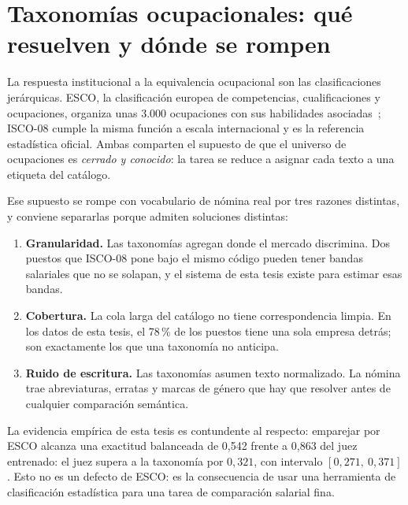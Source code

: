 \documentclass[12pt,a4paper,oneside]{report}
\begin{document}
\section{Taxonomías ocupacionales: qué resuelven y dónde se rompen}
\label{sec:taxonomias}

La respuesta institucional a la equivalencia ocupacional son las clasificaciones
jerárquicas. ESCO, la clasificación europea de competencias, cualificaciones y
ocupaciones, organiza unas 3.000 ocupaciones con sus habilidades
asociadas~\cite{esco2022}; ISCO-08 cumple la misma función a escala internacional y es la
referencia estadística oficial. Ambas comparten el supuesto de que el universo de
ocupaciones es \emph{cerrado y conocido}: la tarea se reduce a asignar cada texto a una
etiqueta del catálogo.

Ese supuesto se rompe con vocabulario de nómina real por tres razones distintas, y
conviene separarlas porque admiten soluciones distintas:

\begin{enumerate}
  \item \textbf{Granularidad.} Las taxonomías agregan donde el mercado discrimina. Dos
  puestos que ISCO-08 pone bajo el mismo código pueden tener bandas salariales que no se
  solapan, y el sistema de esta tesis existe para estimar esas bandas.

  \item \textbf{Cobertura.} La cola larga del catálogo no tiene correspondencia limpia.
  En los datos de esta tesis, el 78\,\% de los puestos tiene una sola empresa detrás; son
  exactamente los que una taxonomía no anticipa.

  \item \textbf{Ruido de escritura.} Las taxonomías asumen texto normalizado. La nómina
  trae abreviaturas, erratas y marcas de género que hay que resolver antes de cualquier
  comparación semántica.
\end{enumerate}

La evidencia empírica de esta tesis es contundente al respecto: emparejar por ESCO alcanza
una exactitud balanceada de 0,542 frente a 0,863 del juez entrenado: el juez supera a la
taxonomía por $0{,}321$, con intervalo $[0{,}271,\ 0{,}371]$.
Esto no es un defecto de ESCO: es la consecuencia de usar una herramienta de
clasificación estadística para una tarea de comparación salarial fina.
\end{document}
